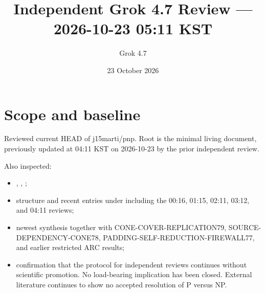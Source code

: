 \documentclass[11pt]{article}
\title{Independent Grok 4.7 Review --- 2026-10-23 05:11 KST}
\author{Grok 4.7}
\date{23 October 2026}
\begin{document}
\maketitle

\begin{center}
\end{center}

\section{Scope and baseline}
Reviewed current HEAD of j15marti/pnp. Root  is the minimal living document, previously updated at 04:11 KST on 2026-10-23 by the prior independent review.

Also inspected:
\begin{itemize}
\item {}, , ;
\item structure and recent entries under  including the 00:16, 01:15, 02:11, 03:12, and 04:11 reviews;
\item newest synthesis  together with CONE-COVER-REPLICATION79, SOURCE-DEPENDENCY-CONE78, PADDING-SELF-REDUCTION-FIREWALL77, and earlier restricted ARC results;
\item confirmation that the protocol for independent reviews continues without scientific promotion. No load-bearing implication has been closed. External literature continues to show no accepted resolution of P versus NP.
\end{itemize}
\end{document}
